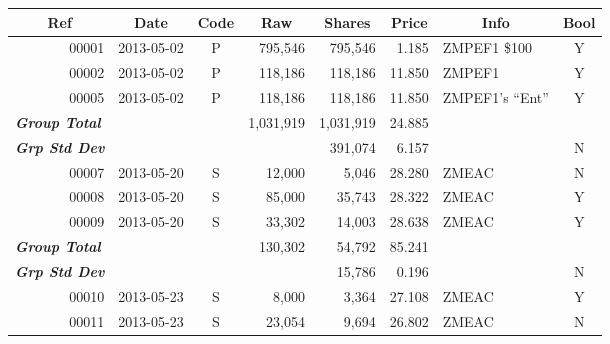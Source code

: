 \documentclass{article}
\begin{document}
\begin{longtable}{rlcrrrlc}
\multicolumn{1}{c}{\bfseries{}Ref}&
\multicolumn{1}{c}{\bfseries{}Date}&
\bfseries{}Code&
\multicolumn{1}{c}{\bfseries{}Raw}&
\multicolumn{1}{c}{\bfseries{}Shares}&
\multicolumn{1}{c}{\bfseries{}Price}&
\multicolumn{1}{c}{\bfseries{}Info}&
\bfseries{}Bool\\
\endhead
\color{Goldenrod1}00001&
2013-05-02&
P&
\color{Goldenrod1}795,546&
\color{Goldenrod1}795,546&
\color{Goldenrod1}1.185&
ZMPEF1 \$100&
\color{green}Y\\
\color{Goldenrod1}00002&
2013-05-02&
P&
\color{Goldenrod1}118,186&
\color{Goldenrod1}118,186&
\color{Goldenrod1}11.850&
ZMPEF1&
\color{green}Y\\
\color{Goldenrod1}00005&
2013-05-02&
P&
\color{Goldenrod1}118,186&
\color{Goldenrod1}118,186&
\color{Goldenrod1}11.850&
ZMPEF1's ``Ent''&
\color{green}Y\\
\multicolumn{1}{l}{\bfseries{}\itshape{}\color{Tomato1}Group Total}&
&
&
\color{Goldenrod1}1,031,919&
\color{Goldenrod1}1,031,919&
\color{Goldenrod1}24.885&
&
\\
\multicolumn{1}{l}{\bfseries{}\itshape{}\color{Tomato1}Grp Std Dev}&
&
&
&
\color{Goldenrod1}391,074&
\color{Goldenrod1}6.157&
&
\color{red}N\\
\color{Goldenrod1}00007&
2013-05-20&
S&
\color{Goldenrod1}12,000&
\color{Goldenrod1}5,046&
\color{Goldenrod1}28.280&
ZMEAC&
\color{red}N\\
\color{Goldenrod1}00008&
2013-05-20&
S&
\color{Goldenrod1}85,000&
\color{Goldenrod1}35,743&
\color{Goldenrod1}28.322&
ZMEAC&
\color{green}Y\\
\color{Goldenrod1}00009&
2013-05-20&
S&
\color{Goldenrod1}33,302&
\color{Goldenrod1}14,003&
\color{Goldenrod1}28.638&
ZMEAC&
\color{green}Y\\
\multicolumn{1}{l}{\bfseries{}\itshape{}\color{Tomato1}Group Total}&
&
&
\color{Goldenrod1}130,302&
\color{Goldenrod1}54,792&
\color{Goldenrod1}85.241&
&
\\
\multicolumn{1}{l}{\bfseries{}\itshape{}\color{Tomato1}Grp Std Dev}&
&
&
&
\color{Goldenrod1}15,786&
\color{Goldenrod1}0.196&
&
\color{red}N\\
\color{Goldenrod1}00010&
2013-05-23&
S&
\color{Goldenrod1}8,000&
\color{Goldenrod1}3,364&
\color{Goldenrod1}27.108&
ZMEAC&
\color{green}Y\\
\color{Goldenrod1}00011&
2013-05-23&
S&
\color{Goldenrod1}23,054&
\color{Goldenrod1}9,694&
\color{Goldenrod1}26.802&
ZMEAC&
\color{red}N\\

\end{longtable}
\end{document}
